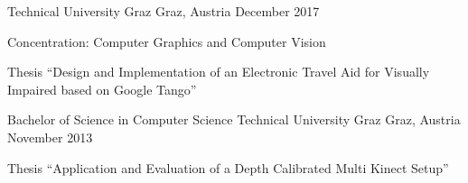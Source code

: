 
\begin{cventries}
  {Technical University Graz}
  {Graz, Austria}
  {December 2017}
  {
    \begin{cvitems}
      \item Concentration: Computer Graphics and Computer Vision
      \item Thesis ``Design and Implementation of an Electronic Travel Aid for Visually Impaired based on Google Tango''
    \end{cvitems}
  }
  \cventry
    {Bachelor of Science in Computer Science} %
    {Technical University Graz} %
    {Graz, Austria} %
    {November 2013} %
    {
    \begin{cvitems} %
      \item {Thesis ``Application and Evaluation of a Depth Calibrated Multi Kinect Setup''}
    \end{cvitems}
    }
\end{cventries}

